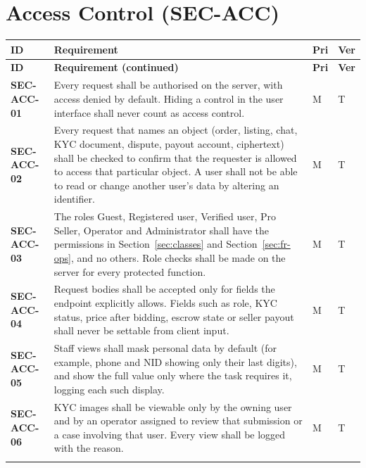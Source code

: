 \documentclass[11pt,a4paper]{report}
\makeatletter
\newenvironment{reqs}{%
  \small
  \begin{longtable}{@{}>{\raggedright\arraybackslash}p{2.35cm}
                       >{\raggedright\arraybackslash}p{10.3cm}
                       >{\centering\arraybackslash}p{0.7cm}
                       >{\centering\arraybackslash}p{0.7cm}@{}}
  \toprule
  \textbf{ID} & \textbf{Requirement} & \textbf{Pri} & \textbf{Ver} \\
  \midrule
  \endfirsthead
  \toprule
  \textbf{ID} & \textbf{Requirement (continued)} & \textbf{Pri} & \textbf{Ver} \\
  \midrule
  \endhead
  \bottomrule
  \endfoot
}{\end{longtable}}
\newcommand{\req}[5]{\leavevmode\textbf{#1}\hypertarget{#1}{} & #5 & #2 & #3 \\ \addlinespace[2pt]}
\makeatother
\begin{document}
\section{Access Control (SEC-ACC)}
\begin{reqs}
\req{SEC-ACC-01}{M}{T}{new}{Every request shall be authorised on the server, with access denied by default. Hiding a control in the user interface shall never count as access control.}
\req{SEC-ACC-02}{M}{T}{NFR-5}{Every request that names an object (order, listing, chat, KYC document, dispute, payout account, ciphertext) shall be checked to confirm that the requester is allowed to access that particular object. A user shall not be able to read or change another user's data by altering an identifier.}
\req{SEC-ACC-03}{M}{T}{new}{The roles Guest, Registered user, Verified user, Pro Seller, Operator and Administrator shall have the permissions in Section~\ref{sec:classes} and Section~\ref{sec:fr-ops}, and no others. Role checks shall be made on the server for every protected function.}
\req{SEC-ACC-04}{M}{T}{new}{Request bodies shall be accepted only for fields the endpoint explicitly allows. Fields such as role, KYC status, price after bidding, escrow state or seller payout shall never be settable from client input.}
\req{SEC-ACC-05}{M}{T}{new}{Staff views shall mask personal data by default (for example, phone and NID showing only their last digits), and show the full value only where the task requires it, logging each such display.}
\req{SEC-ACC-06}{M}{T}{FR-5}{KYC images shall be viewable only by the owning user and by an operator assigned to review that submission or a case involving that user. Every view shall be logged with the reason.}
\end{reqs}
\end{document}
